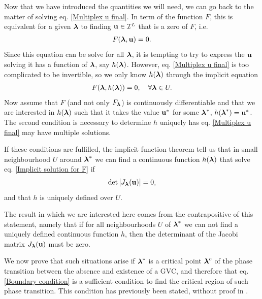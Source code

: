 \documentclass[
11pt, %
english, %
singlespacing, %
nolistspacing, %
liststotoc, %
headsepline, %
]{MastersDoctoralThesis} %
\begin{document}
Now that we have introduced the quantities we will need, we can go back to the matter of solving eq. \eqref{Multiplex u final}. In term of the function $F$, this is equivalent for a given $\boldsymbol{\mathrm{\lambda}}$ to finding $\boldsymbol{\mathrm{u}} \in \mathcal{I}^L$ that is a zero of $F$, i.e.
\begin{align}
	F(\boldsymbol{\mathrm{\lambda}}, \boldsymbol{\mathrm{u}}) = 0. \label{Implicit equation}
\end{align}
Since this equation can be solve for all $\boldsymbol{\mathrm{\lambda}}$, it is tempting to try to express the $\boldsymbol{\mathrm{u}}$ solving it has a function of $\boldsymbol{\mathrm{\lambda}}$, say $h(\boldsymbol{\mathrm{\lambda}})$. However, eq. \eqref{Multiplex u final} is too complicated to be invertible, so we only know $h(\boldsymbol{\mathrm{\lambda}})$ through the implicit equation
\begin{align}
	F(\boldsymbol{\mathrm{\lambda}}, h(\boldsymbol{\mathrm{\lambda}})) = 0, \quad \forall \boldsymbol{\mathrm{\lambda}} \in U. \label{Implicit solution for F}
\end{align}
Now assume that $F$ (and not only $F_{\boldsymbol{\mathrm{\lambda}}}$) is continuously differentiable and that we are interested in $h(\boldsymbol{\mathrm{\lambda}})$ such that it takes the value $\boldsymbol{\mathrm{u}}^*$ for some $\boldsymbol{\mathrm{\lambda}}^*$, $h(\boldsymbol{\mathrm{\lambda}}^*) = \boldsymbol{\mathrm{u}}^*$. The second condition is necessary to determine $h$ uniquely has eq. \eqref{Multiplex u final} may have multiple solutions.

If these conditions are fulfilled, the implicit function theorem tell us that in small neighbourhood $U$ around $\boldsymbol{\mathrm{\lambda}}^*$ we can find a continuous function $h(\boldsymbol{\mathrm{\lambda}})$ that solve eq. \eqref{Implicit solution for F} if
\begin{align}
	\det\left[ J_{\boldsymbol{\mathrm{\lambda}}}(\boldsymbol{\mathrm{u}}) \right] = 0 \label{Boundary condition},
\end{align}
and that $h$ is uniquely defined over $U$.

The result in which we are interested here comes from the contrapositive of this statement, namely that if for all neighbourhoods $U$ of $\boldsymbol{\mathrm{\lambda}}^*$ we can not find a uniquely defined continuous function $h$, then the determinant of the Jacobi matrix $J_{\boldsymbol{\mathrm{\lambda}}}(\boldsymbol{\mathrm{u}})$ must be zero.

We now prove that such situations arise if $\boldsymbol{\mathrm{\lambda}}^*$ is a critical point $\boldsymbol{\mathrm{\lambda}}^c$ of the phase transition between the absence and existence of a GVC, and therefore that eq. \eqref{Boundary condition} is a sufficient condition to find the critical region of such phase transition. This condition has previously been stated, without proof in \cite{baxter2012avalanche}. 
\end{document}
